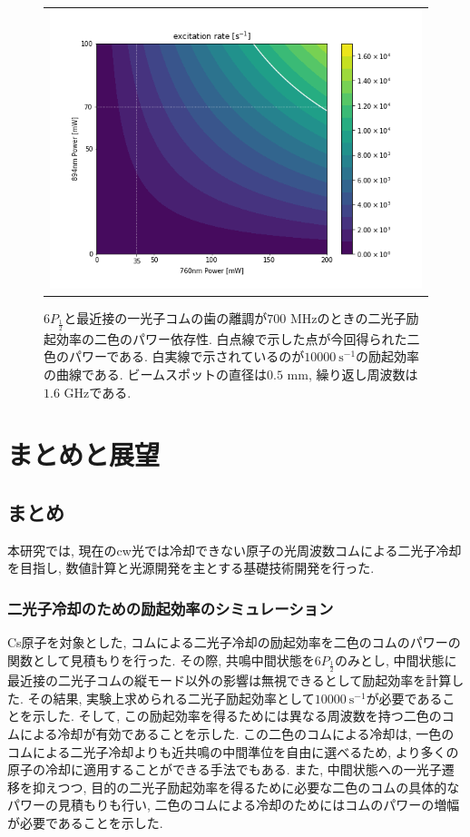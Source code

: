 \documentclass[uplatex, dvipdfmx, a4paper, report, papersize, 11pt]{jsbook}
\begin{document}
\begin{figure}[H]
  \centering
    \begin{tabular}{c}
      \begin{minipage}{1\hsize}
        \centering
          \includegraphics[keepaspectratio,  scale=0.5,  angle=0]
          {figures/chapter4/result-colorplot.png}
          \caption{$6P_{\frac{1}{2}}$と最近接の一光子コムの歯の離調が$700$ MHzのときの二光子励起効率の二色のパワー依存性. 白点線で示した点が今回得られた二色のパワーである. 白実線で示されているのが$10000\ \mathrm{s^{-1}}$の励起効率の曲線である. ビームスポットの直径は$0.5$ mm, 繰り返し周波数は$1.6$ GHzである.}
          \label{result-colorplot}
      \end{minipage}
    \end{tabular}
\end{figure}

\chapter{まとめと展望}
\section{まとめ}
本研究では, 現在のcw光では冷却できない原子の光周波数コムによる二光子冷却を目指し, 数値計算と光源開発を主とする基礎技術開発を行った.
\subsection{二光子冷却のための励起効率のシミュレーション}
Cs原子を対象とした, コムによる二光子冷却の励起効率を二色のコムのパワーの関数として見積もりを行った. その際, 共鳴中間状態を$6P_\frac{1}{2}$のみとし, 中間状態に最近接の二光子コムの縦モード以外の影響は無視できるとして励起効率を計算した. その結果, 実験上求められる二光子励起効率として$10000\ \mathrm{s^{-1}}$が必要であることを示した. そして, この励起効率を得るためには異なる周波数を持つ二色のコムによる冷却が有効であることを示した. この二色のコムによる冷却は, 一色のコムによる二光子冷却よりも近共鳴の中間準位を自由に選べるため, より多くの原子の冷却に適用することができる手法でもある. また, 中間状態への一光子遷移を抑えつつ, 目的の二光子励起効率を得るために必要な二色のコムの具体的なパワーの見積もりも行い, 二色のコムによる冷却のためにはコムのパワーの増幅が必要であることを示した.
\end{document}
